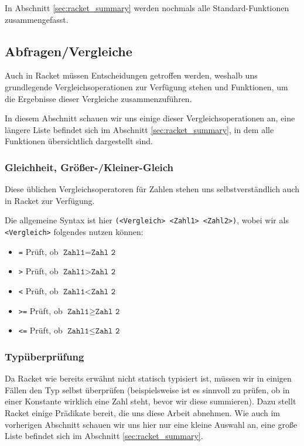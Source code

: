 	In Abschnitt \ref{sec:racket_summary} werden nochmals alle Standard-Funktionen zusammengefasst.

\subsection{Abfragen/Vergleiche}
	Auch in Racket müssen Entscheidungen getroffen werden, weshalb uns grundlegende Vergleichsoperationen zur Verfügung stehen und Funktionen, um die Ergebnisse dieser Vergleiche zusammenzuführen.
	
	In diesem Abschnitt schauen wir uns einige dieser Vergleichsoperationen an, eine längere Liste befindet sich im Abschnitt \ref{sec:racket_summary}, in dem alle Funktionen übersichtlich dargestellt sind.

	\subsubsection{Gleichheit, Größer-/Kleiner-Gleich}
		Diese üblichen Vergleichsoperatoren für Zahlen stehen uns selbstverständlich auch in Racket zur Verfügung.
		
		Die allgemeine Syntax ist hier \texttt{(<Vergleich> <Zahl1> <Zahl2>)}, wobei wir als \texttt{<Vergleich>} folgendes nutzen können:
		\begin{itemize}
			\item \texttt{=}  \tabto{1cm} Prüft, ob \( \texttt{Zahl1} = \texttt{Zahl 2} \)
			\item \texttt{>}  \tabto{1cm} Prüft, ob \( \texttt{Zahl1} > \texttt{Zahl 2} \)
			\item \texttt{<}  \tabto{1cm} Prüft, ob \( \texttt{Zahl1} < \texttt{Zahl 2} \)
			\item \texttt{>=} \tabto{1cm} Prüft, ob \( \texttt{Zahl1} \geq \texttt{Zahl 2} \)
			\item \texttt{<=} \tabto{1cm} Prüft, ob \( \texttt{Zahl1} \leq \texttt{Zahl 2} \)
		\end{itemize}
	
	\subsubsection{Typüberprüfung}
		Da Racket wie bereits erwähnt nicht statisch typisiert ist, müssen wir in einigen Fällen den Typ selbst überprüfen (beispielsweise ist es sinnvoll zu prüfen, ob in einer Konstante wirklich eine Zahl steht, bevor wir diese summieren). Dazu stellt Racket einige Prädikate bereit, die uns diese Arbeit abnehmen. Wie auch im vorherigen Abschnitt schauen wir uns hier nur eine kleine Auswahl an, eine große Liste befindet sich im Abschnitt \ref{sec:racket_summary}.
	
